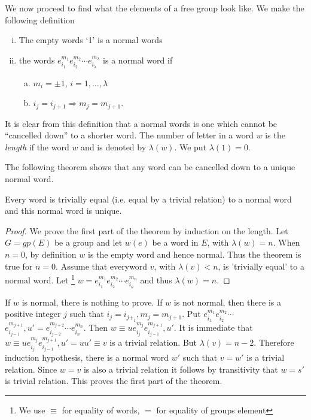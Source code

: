 We now proceed to find what the elements of a free group look like. We
make the following definition 
\begin{definition}
  \begin{enumerate}[(i)]
  \item The empty words `1' is a normal words
  \item the words $e^{m_1}_{i_1}e^{m_2}_{i_2}\cdots e^{m_ \lambda}_{i_
    \lambda}$ is a normal word if 
    \begin{enumerate}[(a)]
    \item $m_i= \pm 1$, $i=1, \ldots, \lambda$
    \item $i_j=i_{j+1}\Rightarrow m_j=m_{j+1}$.
    \end{enumerate}
  \end{enumerate}
\end{definition}

It is clear from this definition that a normal words is one which
cannot be ``cancelled down'' to a shorter word. The number of letter
in a word $w$ is the \textit{length} if the word $w$ and is denoted by
$\lambda(w)$. We put $\lambda(1)=0$. 

The following theorem shows that any word can be cancelled down to a
unique normal word. 

\begin{Theorem}%
  Every word is trivially equal (i.e. equal by a trivial relation) to
  a normal word and this normal word is unique. 
\end{Theorem}

\begin{proof}
  We prove the first part of the theorem by induction on the
  length. Let $G=gp(E)$ be a group and let $w(e)$ be a word in $E$,
  with $\lambda(w)=n$. When $n=0$, by definition $w$ is the empty word
  and hence normal. Thus the theorem is true for $n=0$. Assume that
  everyword $v$, with $\lambda (v)<n$, is 'trivially equal' to a
  normal word. Let \footnote{We use $\equiv$ for equality of words,
    $=$ for equality of groups element}
  $w=e^{m_1}_{i_1}e^{m_2}_{i_2}\cdots e^{m_n}_{i_n}$ and thus $\lambda
  (w)=n$. 
\end{proof}

If $w$ is normal, there is nothing to prove. If $w$ is not normal,
then there is a positive integer $j$ such that
$i_j=i_{j+_1},m_j=m_{j+1}$. Put $e^{m_1}_{i_1}e^{m_2}_{i_2}\cdots$ 
$e^{m_{j+1}}_{i_{j-1}},u'=e^{m_{j+2}}_{i_{j-2}} \cdots
e^{m_n}_{i_n}$. Then $w \equiv
ue^{m_j}_{i_j}e^{m_{j+1}}_{i_{j-1}},u'$. It is immediate that $w
\equiv ue^{m_j}_{i_j}e^{m_{j+1}}_{i_{j-1}},u'=uu' \equiv v$ is a
trivial relation. But $\lambda (v)=n-2$. Therefore induction
hypothesis, there is a normal word $w'$ such that $v=w'$ is a trivial
relation. Since $w=v$ is also a trivial relation it follows by
transitivity that $w=s'$ is trivial relation. This proves the first
part of the theorem. 

